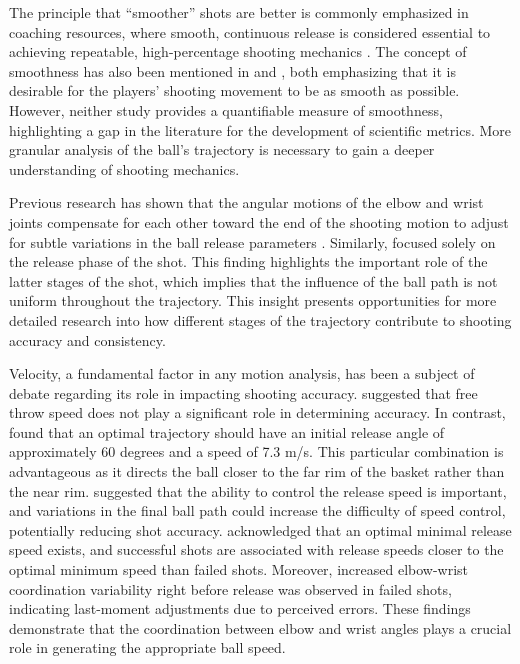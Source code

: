 \documentclass{article}
\begin{document}
      The principle that ``smoother'' shots are better is commonly emphasized in coaching resources, where smooth, continuous release is considered essential to achieving repeatable, high-percentage shooting mechanics \citep{haefner_7_2010, penny_overlooked_2016}. The concept of smoothness has also been mentioned in \citet{pakosz_muscle_2021} and \citet{tran_optimal_2008}, both emphasizing that it is desirable for the players' shooting movement to be as smooth as possible. However, neither study provides a quantifiable measure of smoothness, highlighting a gap in the literature for the development of scientific metrics. More granular analysis of the ball’s trajectory is necessary to gain a deeper understanding of shooting mechanics.

      Previous research has shown that the angular motions of the elbow and wrist joints compensate for each other toward the end of the shooting motion to adjust for subtle variations in the ball release parameters \citep{button_examining_2003}. Similarly, \citet{tran_optimal_2008} focused solely on the release phase of the shot. This finding highlights the important role of the latter stages of the shot, which implies that the influence of the ball path is not uniform throughout the trajectory. This insight presents opportunities for more detailed research into how different stages of the trajectory contribute to shooting accuracy and consistency.

      Velocity, a fundamental factor in any motion analysis, has been a subject of debate regarding its role in impacting shooting accuracy. \citet{pakosz_muscle_2021} suggested that free throw speed does not play a significant role in determining accuracy. In contrast, \citet{hamilton_optimal_1997} found that an optimal trajectory should have an initial release angle of approximately 60 degrees and a speed of 7.3 m/s. This particular combination is advantageous as it directs the ball closer to the far rim of the basket rather than the near rim. \citet{slegers_role_2024} suggested that the ability to control the release speed is important, and variations in the final ball path could increase the difficulty of speed control, potentially reducing shot accuracy. \citet{mullineaux_coordination-variability_2010} acknowledged that an optimal minimal release speed exists, and successful shots are associated with release speeds closer to the optimal minimum speed than failed shots. Moreover, increased elbow-wrist coordination variability right before release was observed in failed shots, indicating last-moment adjustments due to perceived errors. These findings demonstrate that the coordination between elbow and wrist angles plays a crucial role in generating the appropriate ball speed.
      
\end{document}
